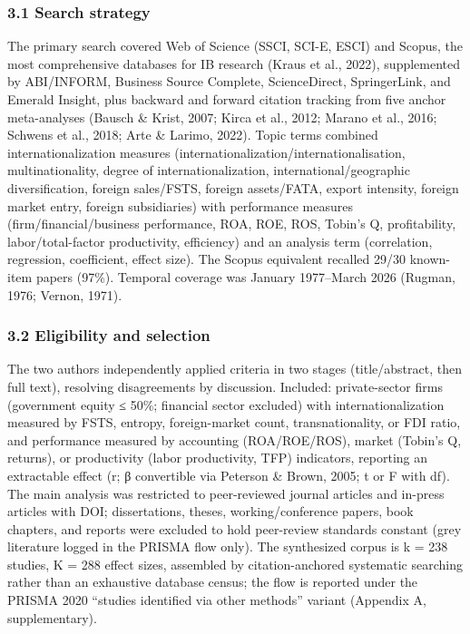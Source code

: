 \documentclass[
  12pt,a4paper]{article}
\begin{document}
\hypertarget{search-strategy}{%
\subsubsection{3.1 Search strategy}\label{search-strategy}}

The primary search covered Web of Science (SSCI, SCI-E, ESCI) and
Scopus, the most comprehensive databases for IB research (Kraus et al.,
2022), supplemented by ABI/INFORM, Business Source Complete,
ScienceDirect, SpringerLink, and Emerald Insight, plus backward and
forward citation tracking from five anchor meta-analyses (Bausch \&
Krist, 2007; Kirca et al., 2012; Marano et al., 2016; Schwens et al.,
2018; Arte \& Larimo, 2022). Topic terms combined internationalization
measures (internationalization/internationalisation, multinationality,
degree of internationalization, international/geographic
diversification, foreign sales/FSTS, foreign assets/FATA, export
intensity, foreign market entry, foreign subsidiaries) with performance
measures (firm/financial/business performance, ROA, ROE, ROS, Tobin's Q,
profitability, labor/total-factor productivity, efficiency) and an
analysis term (correlation, regression, coefficient, effect size). The
Scopus equivalent recalled 29/30 known-item papers (97\%). Temporal
coverage was January 1977--March 2026 (Rugman, 1976; Vernon, 1971).

\hypertarget{eligibility-and-selection}{%
\subsubsection{3.2 Eligibility and
selection}\label{eligibility-and-selection}}

The two authors independently applied criteria in two stages
(title/abstract, then full text), resolving disagreements by discussion.
Included: private-sector firms (government equity ≤ 50\%; financial
sector excluded) with internationalization measured by FSTS, entropy,
foreign-market count, transnationality, or FDI ratio, and performance
measured by accounting (ROA/ROE/ROS), market (Tobin's Q, returns), or
productivity (labor productivity, TFP) indicators, reporting an
extractable effect (r; β convertible via Peterson \& Brown, 2005; t or F
with df). The main analysis was restricted to peer-reviewed journal
articles and in-press articles with DOI; dissertations, theses,
working/conference papers, book chapters, and reports were excluded to
hold peer-review standards constant (grey literature logged in the
PRISMA flow only). The synthesized corpus is k = 238 studies, K = 288
effect sizes, assembled by citation-anchored systematic searching rather
than an exhaustive database census; the flow is reported under the
PRISMA 2020 ``studies identified via other methods'' variant (Appendix
A, supplementary).
\end{document}
